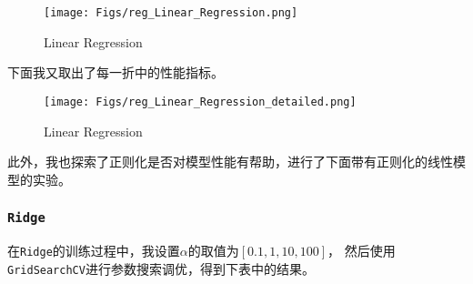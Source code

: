 \documentclass[12pt, a4paper, oneside]{ctexart}
\begin{document}
\begin{figure}[H]
    \centering
    \texttt{[image: Figs/reg\_Linear\_Regression.png]}
    \caption{Linear Regression}
\end{figure}

下面我又取出了每一折中的性能指标。
\begin{figure}[H]
    \centering
    \texttt{[image: Figs/reg\_Linear\_Regression\_detailed.png]}
    \caption{Linear Regression}
\end{figure}

此外，我也探索了正则化是否对模型性能有帮助，进行了下面带有正则化的线性模型的实验。
\subsubsection{\texttt{Ridge}}
在\texttt{Ridge}的训练过程中，我设置$\alpha$的取值为$\left[0.1, 1, 10, 100\right]$，
然后使用\texttt{GridSearchCV}进行参数搜索调优，得到下表中的结果。
\end{document}
